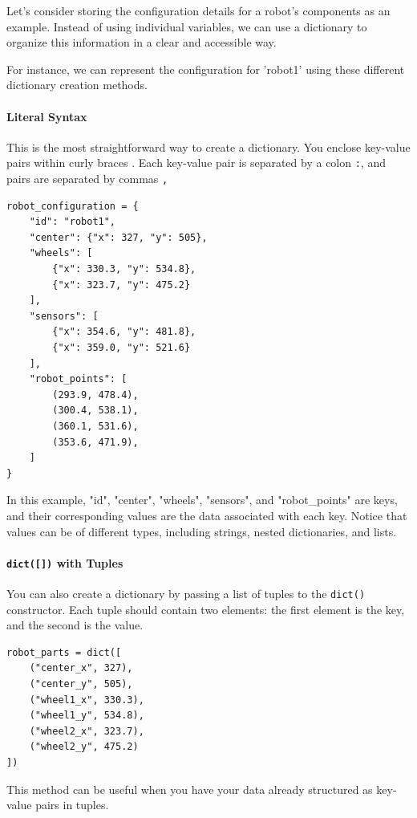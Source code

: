 Let's consider storing the configuration details for a robot's components as an example. Instead of using individual variables, we can use a dictionary to organize this information in a clear and accessible way.

For instance, we can represent the configuration for 'robot1' using these different dictionary creation methods.

\paragraph{Literal Syntax \texttt{{}}}
This is the most straightforward way to create a dictionary. You enclose key-value pairs within curly braces \texttt{{}}. Each key-value pair is separated by a colon \texttt{:}, and pairs are separated by commas \texttt{,}

\begin{verbatim}
robot_configuration = {
    "id": "robot1",
    "center": {"x": 327, "y": 505},
    "wheels": [
        {"x": 330.3, "y": 534.8},
        {"x": 323.7, "y": 475.2}
    ],
    "sensors": [
        {"x": 354.6, "y": 481.8},
        {"x": 359.0, "y": 521.6}
    ],
    "robot_points": [
        (293.9, 478.4),
        (300.4, 538.1),
        (360.1, 531.6),
        (353.6, 471.9),
    ]
}
\end{verbatim}

In this example, "id", "center", "wheels", "sensors", and "robot\_points" are keys, and their corresponding values are the data associated with each key. Notice that values can be of different types, including strings, nested dictionaries, and lists.

\paragraph{\texttt{dict([])} with Tuples}

You can also create a dictionary by passing a list of tuples to the \texttt{dict()} constructor. Each tuple should contain two elements: the first element is the key, and the second is the value.

\begin{verbatim}
robot_parts = dict([
    ("center_x", 327),
    ("center_y", 505),
    ("wheel1_x", 330.3),
    ("wheel1_y", 534.8),
    ("wheel2_x", 323.7),
    ("wheel2_y", 475.2)
])
\end{verbatim}
This method can be useful when you have your data already structured as key-value pairs in tuples.

